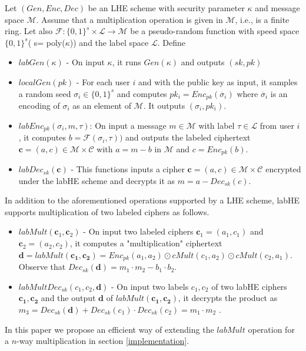 Let $(Gen,Enc,Dec)$ be an \textsf{LHE} scheme with security parameter $\kappa$ and message space $\mathcal{M}$. Assume that a multiplication operation is given in $\mathcal{M}$, i.e., is a finite ring. Let also $\mathcal{F}:\{0,1\}^s \times \mathcal{L}\rightarrow \mathcal{M}$ be a pseudo-random function with speed space $\{0,1\}^s$( s= poly($\kappa $)) and the label space $\mathcal{L}$. Define
\begin{itemize}
\item $labGen(\kappa)$ - On input $\kappa$, it runs $Gen(\kappa)$ and outputs $(sk,pk)$
\item $localGen(pk)$ -  For each user $i$ and with the public key as input, it samples a random seed $\sigma_i \in \{0,1\}^s$ and computes $pk_i = Enc_{pk}(\ddot{\sigma_i})$ where $\ddot{\sigma_i}$ is an  encoding of $\sigma_i$ as an  element of $\mathcal{M}$. It outputs $(\sigma_i,pk_i)$.
\item $labEnc_{pk}(\sigma_i, m , \tau)$: On input a message $m \in \mathcal{M} $ with label $\tau \in \mathcal{L}$  from user $i$, it computes $b=\mathcal{F}(\sigma_i, \tau))$ and outputs the labeled ciphertext $\mathbf{c}=(a,c) \in \mathcal{M} \times \mathcal{C}$ with $ a= m- b$ in $\mathcal{M}$ and $c=Enc_{pk}(b)$.
\item $labDec_{sk}(\mathbf{c})$ - This functions inputs a cipher $\mathbf{c}=(a,c) \in \mathcal{M} \times \mathcal{C}$ encrypted under the labHE scheme and decrypts it as $m=a-Dec_{sk}(c)$.
\end{itemize}
In addition to the aforementioned operations supported by a \textsf{LHE}  scheme, \textsf{labHE} supports multiplication of two labeled ciphers as follows.
\begin{itemize}\item $labMult(\mathbf{c}_1,\mathbf{c}_2)$ -
On input two labeled ciphers $\mathbf{c}_1=(a_1,c_1)$ and $\mathbf{c}_2=(a_2,c_2)$, it computes a "multiplication" ciphertext $\mathbf{d}=labMult(\mathbf{c_1,c_2})=Enc_{pk}(a_1,a_2)\odot cMult(c_1,a_2) \odot cMult(c_2,a_1)$. Observe that $Dec_{sk}(\mathbf{d})=m_1\cdot m_2 -b_1 \cdot b_2$.
\item $labMultDec_{sk}(c_1,c_2,\mathbf{d})$ - On input two labels $c_1,c_2$ of two labHE ciphers $\mathbf{c_1},\mathbf{c_2}$ and the output $\mathbf{d}$ of $labMult(\mathbf{c_1},\mathbf{c_2})$, it decrypts the product as $m_3=Dec_{sk}(\mathbf{d})+Dec_{sk}(c_1)\cdot Dec_{sk}(c_2) = m_1\cdot m_2$ .    \end{itemize}
In this paper we propose an efficient way of extending the $labMult$ operation for a $n$-way multiplication in section \ref{implementation}.


